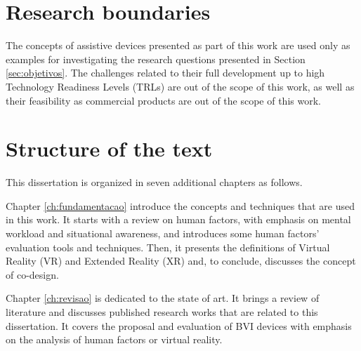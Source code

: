 %

\section{Research boundaries}


The concepts of assistive devices presented as part of this work are used only as examples for investigating the research questions presented in Section \ref{sec:objetivos}. The challenges related to their full development up to high Technology Readiness Levels (TRLs) are out of the scope of this work, as well as their feasibility as commercial products are out of the scope of this work.


\section{Structure of the text}

This dissertation is organized in seven additional chapters as follows.

Chapter \ref{ch:fundamentacao} introduce the concepts and techniques that are used in this work. It starts with a review on human factors, with emphasis on mental workload and situational awareness, and introduces some human factors’ evaluation tools and techniques. Then, it presents the definitions of Virtual Reality (VR) and Extended Reality (XR) and, to conclude, discusses the concept of co-design.

Chapter \ref{ch:revisao} is dedicated to the state of art. It brings a review of literature and discusses published research works that are related to this dissertation. It covers the proposal and evaluation of BVI devices with emphasis on the analysis of human factors or virtual reality.

